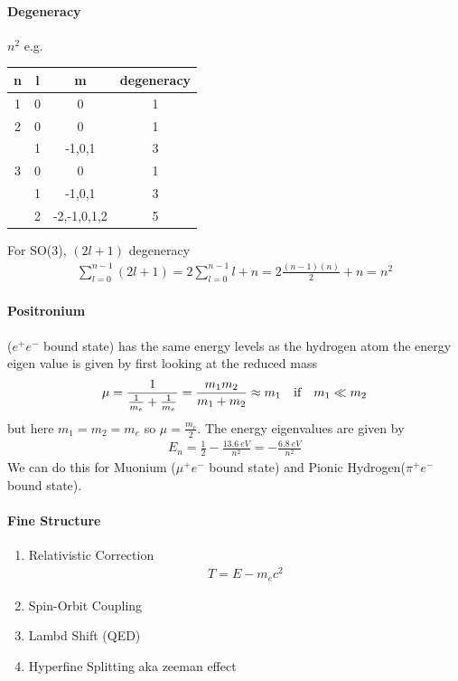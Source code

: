 \documentclass[../main.tex]{subfiles}
\begin{document}
\paragraph*{Degeneracy} $n^2$ e.g.
\begin{table}[ht]
    \centering
    \begin{tabular}{c|c|c|c}
        n & l & m & degeneracy \\
        \hline
        1 & 0 & 0 & 1 \\
        \hline
        2 & 0 & 0 & 1 \\
         & 1 & -1,0,1 & 3 \\
        \hline
        3 & 0 & 0 & 1 \\
        & 1 & -1,0,1 & 3 \\
        & 2 & -2,-1,0,1,2 & 5 \\
    \end{tabular}
\end{table}
For SO(3), $(2l + 1)$ degeneracy
\begin{align*}
    \sum_{l=0}^{n-1} (2l + 1) = 2\sum_{l=0}^{n-1} l + n = 2 \frac{(n - 1)(n)}{2} + n = n^2
\end{align*}
\paragraph*{Positronium} ($e^+ e^-$ bound state) has the same energy levels as the hydrogen atom
the energy eigen value is given by first looking at the reduced mass
\begin{align*}
    \mu = \frac{1}{\frac{1}{m_e} + \frac{1}{m_e}} = \frac{m_1m_2}{m_1 + m_2} \approx m_1    
    \qqtext{if} m_1 \ll m_2
\end{align*}
but here $m_1 = m_2 = m_e$ so $\mu = \frac{m_e}{2}$. The energy eigenvalues are given by
\begin{align*}
    E_n = \frac{1}{2} -\frac{\qty{13.6}{eV}}{n^2} = -\frac{\qty{6.8}{eV}}{n^2}
\end{align*}
We can do this for Muonium ($\mu^+ e^-$ bound state) and Pionic Hydrogen($\pi^+ e^-$ bound state).
\paragraph*{Fine Structure}
\begin{enumerate}
    \item Relativistic Correction
    \begin{align*}
        T = E - m_ec^2
    \end{align*}
    \item Spin-Orbit Coupling
    \item Lambd Shift (QED)
    \item Hyperfine Splitting aka zeeman effect
\end{enumerate}
\end{document}
